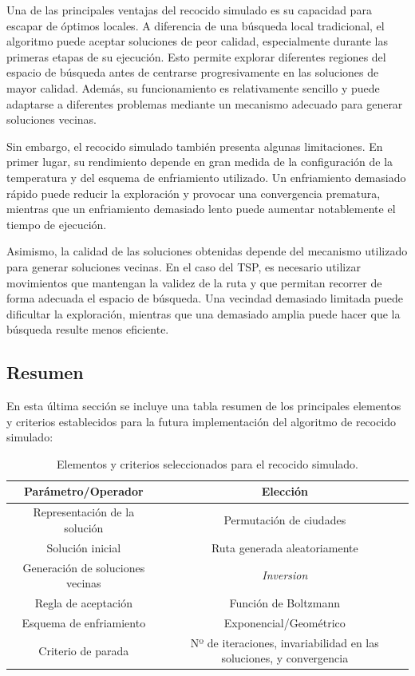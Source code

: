 Una de las principales ventajas del recocido simulado es su capacidad para escapar de óptimos locales. A diferencia de una
búsqueda local tradicional, el algoritmo puede aceptar soluciones de peor calidad, especialmente durante las primeras etapas
de su ejecución. Esto permite explorar diferentes regiones del espacio de búsqueda antes de centrarse progresivamente en las
soluciones de mayor calidad. Además, su funcionamiento es relativamente sencillo y puede adaptarse a diferentes problemas
mediante un mecanismo adecuado para generar soluciones vecinas.

Sin embargo, el recocido simulado también presenta algunas limitaciones. En primer lugar, su rendimiento depende en gran
medida de la configuración de la temperatura y del esquema de enfriamiento utilizado. Un enfriamiento demasiado rápido puede
reducir la exploración y provocar una convergencia prematura, mientras que un enfriamiento demasiado lento puede aumentar
notablemente el tiempo de ejecución.

Asimismo, la calidad de las soluciones obtenidas depende del mecanismo utilizado para generar soluciones vecinas. En el
caso del TSP, es necesario utilizar movimientos que mantengan la validez de la ruta y que permitan recorrer de forma adecuada
el espacio de búsqueda. Una vecindad demasiado limitada puede dificultar la exploración, mientras que una demasiado amplia
puede hacer que la búsqueda resulte menos eficiente.

\subsection{Resumen}
\label{subsec:sa_summary}

En esta última sección se incluye una tabla resumen de los principales elementos y criterios establecidos para la futura
implementación del algoritmo de recocido simulado:

\begin{table}[H]
\renewcommand{\arraystretch}{1.3}
\caption{Elementos y criterios seleccionados para el recocido simulado.}
\label{tab:sa_decisions}
\begin{center}
\begin{tabular}{|c|c|}
\hline
\textbf{Parámetro/Operador} & \textbf{Elección} \\
\hline
Representación de la solución & Permutación de ciudades \\
\hline
Solución inicial & Ruta generada aleatoriamente \\
\hline
Generación de soluciones vecinas & \textit{Inversion} \\
\hline
Regla de aceptación & Función de Boltzmann \\
\hline
Esquema de enfriamiento & Exponencial/Geométrico \\
\hline
Criterio de parada & Nº de iteraciones, invariabilidad en las soluciones, y convergencia \\
\hline
\end{tabular}
\end{center}
\end{table}

